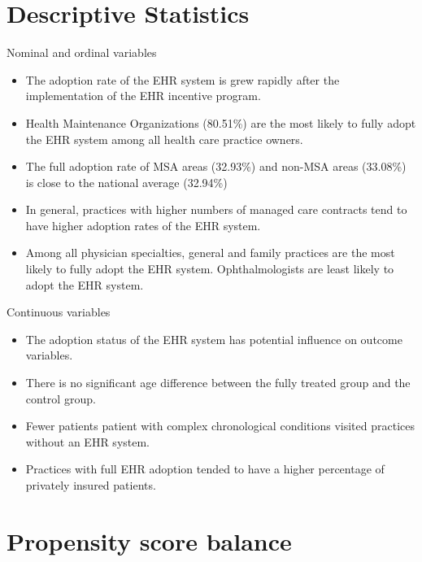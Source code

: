 \documentclass[10pt, compress]{beamer}
\begin{document}
\section{Descriptive Statistics}

\begin{frame}{Nominal and ordinal variables}

      \begin{itemize}
        \item The adoption rate of the EHR system is grew rapidly after the implementation of the EHR incentive program.
        \item Health Maintenance Organizations (80.51\%) are the most likely to fully adopt the EHR system among all health care practice owners.
        \item The full adoption rate of MSA areas (32.93\%) and non-MSA areas (33.08\%) is close to the national average (32.94\%)
        \item In general, practices with higher numbers of managed care contracts tend to have higher adoption rates of the EHR system.
        \item Among all physician specialties, general and family practices are the most likely to fully adopt the EHR system. Ophthalmologists are least likely to adopt the EHR system.
      \end{itemize}
      \end{frame}
      
\begin{frame}{Continuous variables}

      \begin{itemize}
        \item The adoption status of the EHR system has potential influence on outcome variables.
        \item There is no significant age difference between the fully treated group and the control group.
        \item Fewer patients patient with complex chronological conditions visited practices without an EHR system.
        \item Practices with full EHR adoption tended to have a higher percentage of privately insured patients.
      \end{itemize}
      \end{frame}
      
\section{Propensity score balance}
\end{document}
